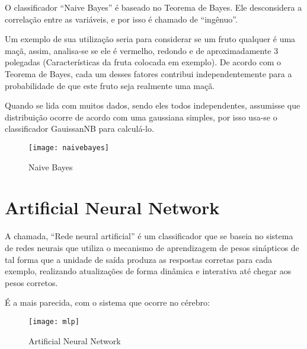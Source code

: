 O classificador “Naive Bayes” é baseado no Teorema de Bayes. Ele desconsidera a correlação entre as variáveis, e por isso é chamado de “ingênuo”.

Um exemplo de sua utilização seria para considerar se um fruto qualquer é uma maçã, assim, analisa-se se ele é vermelho, redondo e de aproximadamente 3 polegadas (Características da fruta colocada em exemplo). De acordo com o Teorema de Bayes, cada um desses fatores contribui independentemente para a probabilidade de que este fruto seja realmente uma maçã.

Quando se lida com muitos dados, sendo eles todos independentes, assumisse que distribuição ocorre de acordo com uma gaussiana simples, por isso usa-se o classificador GauissanNB para calculá-lo.


\begin{figure}[!htb]
\begin{center}
\caption{Naive Bayes}
\texttt{[image: naivebayes]}
\end{center}

\cite{NAIVEBAYES}
\end{figure}


\section{\textbf{Artificial Neural Network}}

A chamada, “Rede neural artificial” é um classificador que se baseia no sistema de redes neurais que utiliza o mecanismo de aprendizagem de pesos sinápticos de tal forma que a unidade de saída produza as respostas corretas para cada exemplo, realizando atualizações de forma dinâmica e interativa até chegar aos pesos corretos.

É a mais parecida, com o sistema que ocorre no cérebro:


\begin{figure}[!htb]
\begin{center}
\caption{Artificial Neural Network}
\texttt{[image: mlp]}
\end{center}
\cite{MLP}
\end{figure}


